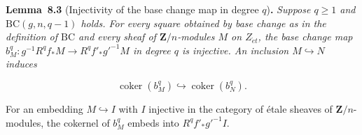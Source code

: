 \documentclass[11pt]{article}
\newenvironment{bpstatement}[2]{\par\addvspace{0.6\baselineskip}\noindent\textbf{#1}#2\textbf{.}\enspace\ignorespaces}
  {\par\addvspace{0.4\baselineskip}}
\newenvironment{bpstatementit}[2]{\begin{bpstatement}{#1}{#2}\itshape\ignorespaces}{\end{bpstatement}}
\begin{document}
\label{bp653}%
\begin{bpstatementit}{Lemma~8.3}{ (Injectivity of the base change map in degree $q$)}
Suppose \(q\geq1\) and \(\mathrm{BC}(g,n,q-1)\) holds. For every square obtained by base change as in the definition of \(\mathrm{BC}\) and every sheaf of \(\mathbf Z/n\)-modules \(M\) on \(Z_{\acute{e}t}\), the base change map \(b_M^q:g^{-1}R^qf_*M\to R^qf'_*g'^{-1}M\) in degree \(q\) is injective. An inclusion \(M\hookrightarrow N\) induces

\[
\operatorname{coker}(b_M^q)
\hookrightarrow\operatorname{coker}(b_N^q).
\]

For an embedding \(M\hookrightarrow I\) with \(I\) injective in the category of étale sheaves of \(\mathbf Z/n\)-modules, the cokernel of \(b_M^q\) embeds into \(R^qf'_*g'^{-1}I\).
\end{bpstatementit}
\end{document}
